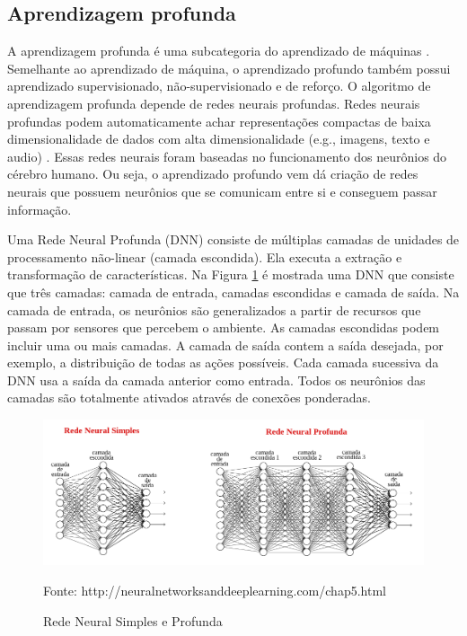 \subsection{Aprendizagem profunda}

A aprendizagem profunda é uma subcategoria do aprendizado de máquinas \cite{lecun2015deep}.
Semelhante ao aprendizado de máquina, o aprendizado profundo também possui aprendizado supervisionado, não-supervisionado e de reforço.
O algoritmo de aprendizagem profunda depende de redes neurais profundas. 
Redes neurais profundas podem automaticamente achar representações compactas de baixa dimensionalidade de dados com alta dimensionalidade (e.g., imagens, texto e audio) \cite{arulkumaran2017brief}.
Essas redes neurais foram baseadas no funcionamento dos neurônios do cérebro humano. 
Ou seja, o aprendizado profundo vem dá criação de redes neurais que possuem neurônios que se comunicam entre si e conseguem passar informação. 

Uma Rede Neural Profunda (DNN) consiste de múltiplas camadas de unidades de processamento não-linear (camada escondida). Ela executa a extração e transformação de características. Na Figura \ref{fig:NN} é mostrada uma DNN que consiste que três camadas: camada de entrada, camadas escondidas e camada de saída. Na camada de entrada, os neurônios são generalizados a partir de recursos que passam por sensores que percebem o ambiente. As camadas escondidas podem incluir uma ou mais camadas. A camada de saída contem a saída desejada, por exemplo, a distribuição de todas as ações possíveis.
Cada camada sucessiva da DNN usa a saída da camada anterior como entrada.
Todos os neurônios das camadas são totalmente ativados através de conexões ponderadas.

\begin{figure}[H]
\caption{Rede Neural Simples e Profunda}
\centerline{\includegraphics[width=\columnwidth]{imagens/neural_network.png}}
\small{Fonte: http://neuralnetworksanddeeplearning.com/chap5.html}
\label{fig:NN}
\end{figure}

